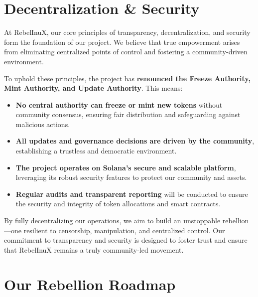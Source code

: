 \documentclass{article}
\begin{document}
\section[
\texorpdfstring{\color{primaryColor}Decentralization \& Security}{Decentralization \& Security}
]{\color{primaryColor}\textbf{Decentralization \& Security}}
\begin{tcolorbox}[colback=headerColor!10!white, colframe=headerColor, boxrule=2pt, width=\textwidth, arc=6mm, left=8mm, right=8mm, top=6mm, bottom=6mm]

At RebelInuX, our core principles of transparency, decentralization, and security form the foundation of our project. We believe that true empowerment arises from eliminating centralized points of control and fostering a community-driven environment.

To uphold these principles, the project has \textbf{renounced the Freeze Authority, Mint Authority, and Update Authority}. This means:

\begin{itemize}
    \item \textbf{No central authority can freeze or mint new tokens} without community consensus, ensuring fair distribution and safeguarding against malicious actions.
    \item \textbf{All updates and governance decisions are driven by the community}, establishing a trustless and democratic environment.
    \item \textbf{The project operates on Solana’s secure and scalable platform}, leveraging its robust security features to protect our community and assets.
    \item \textbf{Regular audits and transparent reporting} will be conducted to ensure the security and integrity of token allocations and smart contracts.
\end{itemize}

By fully decentralizing our operations, we aim to build an unstoppable rebellion—one resilient to censorship, manipulation, and centralized control. Our commitment to transparency and security is designed to foster trust and ensure that RebelInuX remains a truly community-led movement.

\end{tcolorbox}

\vspace{1em}
\section[
\texorpdfstring{\color{primaryColor}Our Rebellion Roadmap}{Our Rebellion Roadmap}
]{\color{primaryColor}\textbf{Our Rebellion Roadmap}}
\end{document}
